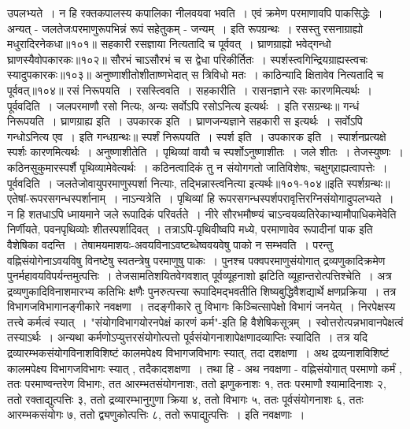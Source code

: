 उपलभ्यते~। न हि रक्तकपालस्य कपालिका नीलवयवा भवति~। एवं क्रमेण परमाणावपि पाकसिद्धेः~। अन्यत् - जलतेजःपरमाणुरूपभिन्नं रूपं सहेतुकम् - जन्यम्~। इति
रूपग्रन्थः~।
रसस्तु रसनाग्राह्यो मधुरादिरनेकधा॥१०१॥
सहकारी रसज्ञाया नित्यतादि च पूर्ववत्~।
घ्राणग्राह्यो भवेद्गन्धो घ्राणस्यैवोपकारकः॥१०२॥
सौरभं चाऽसौरभं च स द्वेधा परिकीर्तितः~।
स्पर्शस्त्वगिन्द्रियग्राह्यस्त्वचः स्यादुपकारकः॥१०३॥
अनुष्णाशीतोशीताष्णभेदात् स त्रिविधो मतः~।
काठिन्यादि क्षितावेव नित्यतादि च पूर्ववत्॥१०४॥
रसं निरूपयति~। रसस्त्विवति~। सहकारीति~। रासनज्ञाने रसः कारणमित्यर्थः~। पूर्ववदिति~। जलपरमाणौ रसो नित्यः, अन्यः सर्वोऽपि रसोऽनित्य इत्यर्थः~। इति
रसग्रन्थः॥
गन्धं निरूपयति~। घ्राणग्राह्य इति~। उपकारक इति~। घ्राणजन्यज्ञाने सहकारी स इत्यर्थः~। सर्वोऽपि गन्धोऽनित्य एव~। इति गन्धग्रन्थः॥
स्पर्शं निरूपयति~। स्पर्श इति~। उपकारक इति~। स्पार्शनप्रत्यक्षे स्पर्शः कारणमित्यर्थः~। अनुष्णाशीतेति~। पृथिव्यां वायौ च स्पर्शोऽनुष्णाशीतः~। जले शीतः~।
तेजस्युष्णः~। कठिनसुकुमारस्पर्शै पृथिव्यामेवेत्यर्थः~। कठिनत्वादिकं तु न संयोगगतो जातिविशेषः, चक्षुग्र्राह्यत्वापत्तेः~। पूर्ववदिति~। जलतेजोवायुपरमाणुस्पर्शा नित्याः,
तद्भिन्नास्त्वनित्या इत्यर्थः॥१०१-१०४॥इति स्पर्शग्रन्थः॥
एतेषां-रूपरसगन्धस्पर्शानाम्~। नाऽन्यत्रेति~। पृथिव्यां हि रूपरसगन्धस्पर्शपरावृत्तिरग्निसंयोगादुपलभ्यते~। न हि शतधाऽपि ध्मायमाने जले रूपादिकं परिवर्तते~। नीरे
सौरभमौष्ण्यं चाऽन्वयव्यतिरेकाभ्यामौपाधिकमेवेति निर्णीयते, पवनपृथिव्योः शीतस्पर्शादिवत्~।
तत्राऽपि-पृथिवीष्वपि मध्ये, परमाणावेव रूपादीनां पाक इति वैशेषिका वदन्ति~। तेषामयमाशयः-अवयविनाऽवष्टब्धेष्ववयवेषु पाको न सम्भवति~। परन्तु
वह्निसंयोगेनाऽवयविषु विनष्टेषु स्वतन्त्रेषु परमाणुषु पाकः~। पुनश्च पक्वपरमाणुसंयोगात् द्रव्यणुकादिक्रमेण पुनर्महावयविपर्यन्तमुत्पत्तिः~। तेजसामतिशयितवेगवशात्
पूर्वव्यूहनाशो झटिति व्यूहान्तरोत्पत्तिश्चेति~।
अत्र द्रव्यणुकादिविनाशमारभ्य कतिभिः क्षणैः पुनरुत्पत्त्या रूपादिमद्भवतीति शिष्यबुद्धिवैशद्यार्थे क्षणप्रक्रिया~।
तत्र विभागजविभागानङ्गीकारे नवक्षणा~।
तदङ्गीकारे तु विभागः किञ्चित्सापेक्षो विभागं जनयेत्~। निरपेक्षस्य तत्त्वे कर्मत्वं स्यात्~। "संयोगविभागयोरनपेक्षं कारणं कर्म"-इति हि वैशेषिकसूत्रम्~।
स्वोत्तरोत्पन्नभावानपेक्षत्वं तस्याऽर्थः~। अन्यथा कर्मणोऽप्युत्तरसंयोगोत्पत्तो पूर्वसंयोगनाशापेक्षणादव्याप्तिः स्यादिति~। तत्र यदि द्रव्यारम्भकसंयोगविनाशविशिष्टं कालमपेक्ष्य
विभागजविभागः स्यात्, तदा दशक्षणा~।
अथ द्रव्यनाशविशिष्टं कालमपेक्ष्य विभागजविभागः स्यात् , तदैकादशक्षणा~। तथा हि -
अथ नवक्षणा -
वह्निसंयोगात् परमाणो कर्मं , ततः परमाण्वन्तरेण विभागः, तत आरम्भतसंयोगनाशः, ततो झणुकनाशः १, ततः परमाणौ श्यामादिनाशः २, ततो रक्ताद्युत्पत्तिः ३,
ततो द्रव्यारम्भानुगुणा क्रिया ४, ततो विभागः ५, ततः पूर्वसंयोगनाशः ६, ततः आरम्भकसंयोगः ७, ततो द्व्यणुकोत्पत्तिः ८, ततो रूपाद्युत्पत्तिः~। इति नवक्षणाः~।
